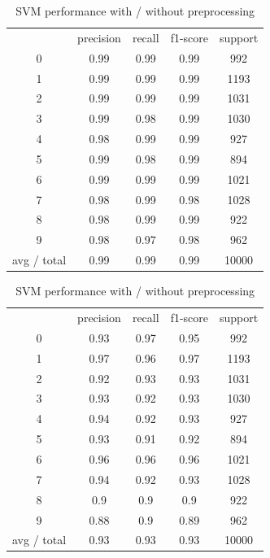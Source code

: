 \documentclass{article}
\begin{document}
\begin{table}[!htb]
	\centering
	\small 
	\caption{SVM performance with / without preprocessing}
		\begin{tabular}{ccccc}
			& precision & recall & f1-score & support \\
			0     & 0.99  & 0.99  & 0.99  & 992 \\
			1     & 0.99  & 0.99  & 0.99  & 1193 \\
			2     & 0.99  & 0.99  & 0.99  & 1031 \\
			3     & 0.99  & 0.98  & 0.99  & 1030 \\
			4     & 0.98  & 0.99  & 0.99  & 927 \\
			5     & 0.99  & 0.98  & 0.99  & 894 \\
			6     & 0.99  & 0.99  & 0.99  & 1021 \\
			7     & 0.98  & 0.99  & 0.98  & 1028 \\
			8     & 0.98  & 0.99  & 0.99  & 922 \\
			9     & 0.98  & 0.97  & 0.98  & 962 \\
			avg / total & 0.99  & 0.99  & 0.99  & 10000 \\
		\end{tabular}%
		\begin{tabular}{ccccc}
			& precision & recall & f1-score & support \\
			0     & 0.93  & 0.97  & 0.95  & 992 \\
			1     & 0.97  & 0.96  & 0.97  & 1193 \\
			2     & 0.92  & 0.93  & 0.93  & 1031 \\
			3     & 0.93  & 0.92  & 0.93  & 1030 \\
			4     & 0.94  & 0.92  & 0.93  & 927 \\
			5     & 0.93  & 0.91  & 0.92  & 894 \\
			6     & 0.96  & 0.96  & 0.96  & 1021 \\
			7     & 0.94  & 0.92  & 0.93  & 1028 \\
			8     & 0.9   & 0.9   & 0.9   & 922 \\
			9     & 0.88  & 0.9   & 0.89  & 962 \\
			avg / total & 0.93  & 0.93  & 0.93  & 10000 \\
		\end{tabular}%
	
	\label{tbl:SVM_with_score}%
\end{table}%
\end{document}

